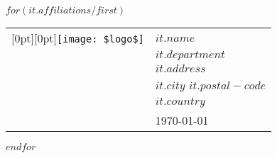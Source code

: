 $for(it.affiliations/first)$\begin{tabularx}{\linewidth}{@{}X!{\color{gray}\vrule width1.5pt\,}l@{}}\raisebox{\dimexpr-\height + 3ex}[0pt][0pt]{\texttt{[image: \$logo\$]}} & $it.name$ \\ & $it.department$\\ & $it.address$\\ & $it.city$ $it.postal-code$\\ & $it.country$\\ & \today \end{tabularx}$endfor$
